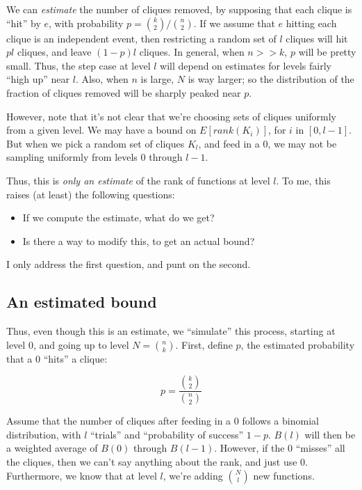 \documentclass[12pt]{article}
\theoremstyle{definition}
\begin{document}
We can {\em estimate} the number of cliques removed, by supposing that each
clique is ``hit'' by $e$, with probability $p = {k \choose 2} / {n \choose 2}$.
If we assume that $e$ hitting each clique is an independent event, then
restricting a random set of $l$ cliques will hit $pl$ cliques, and
leave $(1-p)l$ cliques.
In general, when $n>>k$, $p$ will be pretty small. Thus, the step case at
level $l$ will depend on estimates for levels fairly ``high up'' near $l$.
Also, when $n$ is large, $N$ is way larger; so the distribution of
the fraction of cliques removed will be sharply peaked near $p$.

However, note that it's not clear that we're choosing sets of cliques uniformly from
a given level. We may have a bound on $E[rank(K_i)]$, for $i$ in $[0,l-1]$.
But when we pick a random set of cliques $K_l$, and feed in a 0, we may not be
sampling uniformly from levels 0 through $l-1$.

Thus, this is {\em only an estimate} of the rank of functions at level $l$.
To me, this raises (at least) the following questions:

\begin{itemize}

\item If we compute the estimate, what do we get?

\item Is there a way to modify this, to get an actual bound?

\end{itemize}

I only address the first question, and punt on the second.

\subsection{An estimated bound}

Thus, even though this is an estimate, we ``simulate'' this process, starting
at level 0, and going up to level $N = {n \choose k}$. 
First, define $p$, the estimated probability that a 0 ``hits'' a clique:

\[ p = \frac{{k \choose 2}}{{n \choose 2}} \]

Assume that the number of cliques after feeding in a 0 follows a binomial
distribution, with $l$ ``trials'' and ``probability of success'' $1-p$.
$B(l)$ will then be a weighted average of $B(0)$ through $B(l-1)$. However,
if the 0 ``misses'' all the cliques, then we can't say anything about the
rank, and just use 0.
Furthermore, we know that at level $l$, we're adding ${N \choose l}$ new
functions.
\end{document}
